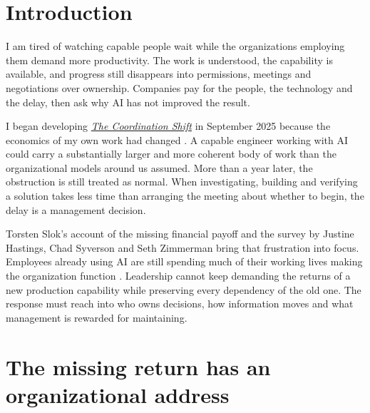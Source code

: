 \section{Introduction}\label{introduction}

\begin{EssayColumns}

I am tired of watching capable people wait while the organizations
employing them demand more productivity. The work is understood, the
capability is available, and progress still disappears into permissions,
meetings and negotiations over ownership. Companies pay for the people,
the technology and the delay, then ask why AI has not improved the
result.

I began developing \href{https://c89.systems/10x.pdf}{\emph{The
Coordination Shift}} in September 2025 because the economics of my own
work had changed \citep{blomgren2025coordination}. A capable engineer
working with AI could carry a substantially larger and more coherent
body of work than the organizational models around us assumed. More than
a year later, the obstruction is still treated as normal. When
investigating, building and verifying a solution takes less time than
arranging the meeting about whether to begin, the delay is a management
decision.

\NextEssayColumn

Torsten Slok's account of the missing financial payoff and the survey by
Justine Hastings, Chad Syverson and Seth Zimmerman bring that
frustration into focus. Employees already using AI are still spending
much of their working lives making the organization function
\citep{slok2026payoff} \citep{hastings2026deployment}. Leadership cannot
keep demanding the returns of a new production capability while
preserving every dependency of the old one. The response must reach into
who owns decisions, how information moves and what management is
rewarded for maintaining.

\end{EssayColumns}


\clearpage

\section{The missing return has an organizational
address}\label{the-missing-return-has-an-organizational-address}

